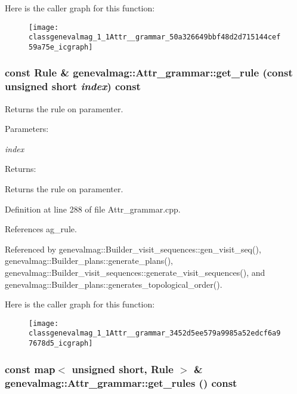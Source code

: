 Here is the caller graph for this function:\nopagebreak
\begin{figure}[H]
\begin{center}
\leavevmode
\texttt{[image: classgenevalmag\_1\_1Attr\_\_grammar\_50a326649bbf48d2d715144cef59a75e\_icgraph]}
\end{center}
\end{figure}
\hypertarget{classgenevalmag_1_1Attr__grammar_3452d5ee579a9985a52edcf6a97678d5}{
\subsubsection[{get\_\-rule}]{\setlength{\rightskip}{0pt plus 5cm}const {\bf Rule} \& genevalmag::Attr\_\-grammar::get\_\-rule (const unsigned short {\em index}) const}}
\label{classgenevalmag_1_1Attr__grammar_3452d5ee579a9985a52edcf6a97678d5}


Returns the rule on paramenter. \begin{Desc}
\item[Parameters:]
\begin{description}
\item[{\em index}]\end{description}
\end{Desc}
\begin{Desc}
\item[Returns:]\end{Desc}
Returns the rule on paramenter. 

Definition at line 288 of file Attr\_\-grammar.cpp.

References ag\_\-rule.

Referenced by genevalmag::Builder\_\-visit\_\-sequences::gen\_\-visit\_\-seq(), genevalmag::Builder\_\-plans::generate\_\-plans(), genevalmag::Builder\_\-visit\_\-sequences::generate\_\-visit\_\-sequences(), and genevalmag::Builder\_\-plans::generates\_\-topological\_\-order().

Here is the caller graph for this function:\nopagebreak
\begin{figure}[H]
\begin{center}
\leavevmode
\texttt{[image: classgenevalmag\_1\_1Attr\_\_grammar\_3452d5ee579a9985a52edcf6a97678d5\_icgraph]}
\end{center}
\end{figure}
\hypertarget{classgenevalmag_1_1Attr__grammar_41be9d108df7f8159bd989a5c174be87}{
\subsubsection[{get\_\-rules}]{\setlength{\rightskip}{0pt plus 5cm}const map$<$ unsigned short, {\bf Rule} $>$ \& genevalmag::Attr\_\-grammar::get\_\-rules () const}}
\label{classgenevalmag_1_1Attr__grammar_41be9d108df7f8159bd989a5c174be87}


